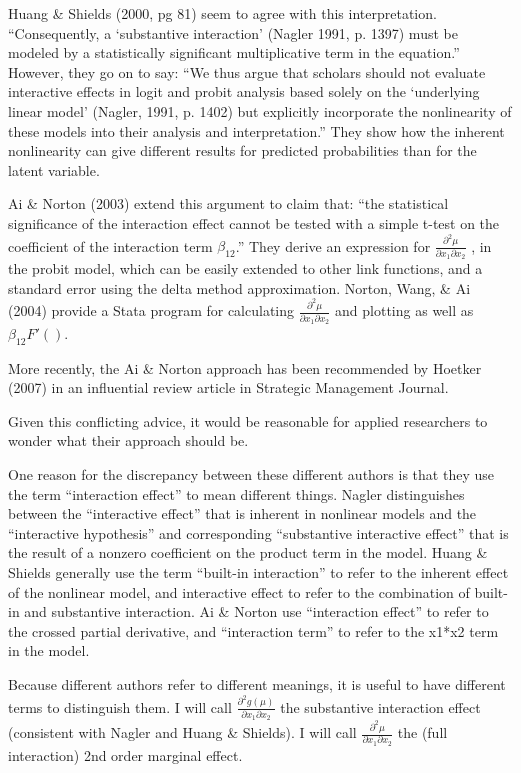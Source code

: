 Huang \& Shields (2000, pg 81) seem to agree with this interpretation.
“Consequently, a ‘substantive interaction’ (Nagler 1991, p. 1397)
must be modeled by a statistically significant multiplicative term in
the equation.”  However, they go on to say: “We thus argue that
scholars should not evaluate interactive effects in logit and probit
analysis based solely on the ‘underlying linear model’ (Nagler,
1991, p. 1402) but explicitly incorporate the nonlinearity of these
models into their analysis and interpretation.”  They show how the
inherent nonlinearity can give different results for predicted
probabilities than for the latent variable.

Ai \& Norton (2003) extend this argument to claim that: “the
statistical significance of the interaction effect cannot be tested
with a simple t-test on the coefficient of the interaction
term $\beta_{12}$.”  They derive an expression for $\frac{\partial^2 \mu}{\partial x_1 \partial
  x_2}$ ,  in the probit model, which
can be easily extended to other link functions, and a standard error
using the delta method approximation.  Norton, Wang, \& Ai (2004)
provide a Stata program for calculating $\frac{\partial^2 \mu}{\partial x_1 \partial
  x_2}$  and plotting as well as $\beta_{12} F'()$.

More recently, the Ai \& Norton approach has been recommended by
Hoetker (2007) in an influential review article in Strategic
Management Journal.

Given this conflicting advice, it would be reasonable for applied
researchers to wonder what their approach should be.

One reason for the discrepancy between these different authors is that
they use the term “interaction effect” to mean different things.
Nagler distinguishes between the “interactive effect” that is
inherent in nonlinear models and the “interactive hypothesis” and
corresponding “substantive interactive effect” that is the result of
a nonzero coefficient on the product term in the model.  Huang \&
Shields generally use the term “built-in interaction” to refer to
the inherent effect of the nonlinear model, and interactive effect to
refer to the combination of built-in and substantive interaction.  Ai
\& Norton use “interaction effect” to refer to the crossed partial
derivative, and “interaction term” to refer to the x1*x2 term in the
model.

Because different authors refer to different meanings, it is useful to
have different terms to distinguish them.  I will call $\frac{\partial^2
g(\mu)}{\partial x_1 \partial x_2}$ the
substantive interaction effect (consistent with Nagler and Huang \&
Shields).  I will call  $\frac{\partial^2
\mu}{\partial x_1 \partial x_2}$ the (full interaction) 2nd order
marginal effect.




